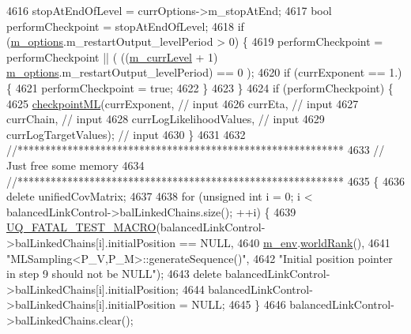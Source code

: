 \begin{DoxyCode}
{{4616     stopAtEndOfLevel = currOptions->m\_stopAtEnd;
4617     \textcolor{keywordtype}{bool} performCheckpoint = stopAtEndOfLevel;
4618     \textcolor{keywordflow}{if} (\hyperlink{class_q_u_e_s_o_1_1_m_l_sampling_af8504cc57ec72b3c52833826b2bfff8e}{m\_options}.m\_restartOutput\_levelPeriod > 0) \{
4619       performCheckpoint = performCheckpoint || ( ((\hyperlink{class_q_u_e_s_o_1_1_m_l_sampling_af9416874c856e50f3b35270e801f17e4}{m\_currLevel} + 1) %
      \hyperlink{class_q_u_e_s_o_1_1_m_l_sampling_af8504cc57ec72b3c52833826b2bfff8e}{m\_options}.m\_restartOutput\_levelPeriod) == 0 );
4620       \textcolor{keywordflow}{if} (currExponent == 1.) \{
4621         performCheckpoint = \textcolor{keyword}{true};
4622       \}
4623     \}
4624     \textcolor{keywordflow}{if} (performCheckpoint) \{
4625       \hyperlink{class_q_u_e_s_o_1_1_m_l_sampling_aa8e7bb1bd54ccafb9b276127a76eba71}{checkpointML}(currExponent,            \textcolor{comment}{// input}
4626                    currEta,                 \textcolor{comment}{// input}
4627                    currChain,               \textcolor{comment}{// input}
4628                    currLogLikelihoodValues, \textcolor{comment}{// input}
4629                    currLogTargetValues);    \textcolor{comment}{// input}
4630     \}
4631 
4632     \textcolor{comment}{//***********************************************************}
4633     \textcolor{comment}{// Just free some memory}
4634     \textcolor{comment}{//***********************************************************}
4635     \{
4636       \textcolor{keyword}{delete} unifiedCovMatrix;
4637 
4638       \textcolor{keywordflow}{for} (\textcolor{keywordtype}{unsigned} \textcolor{keywordtype}{int} i = 0; i < balancedLinkControl->balLinkedChains.size(); ++i) \{
4639         \hyperlink{_defines_8h_a56d63d18d0a6d45757de47fcc06f574d}{UQ\_FATAL\_TEST\_MACRO}(balancedLinkControl->balLinkedChains[i].initialPosition == 
      NULL,
4640                             \hyperlink{class_q_u_e_s_o_1_1_m_l_sampling_a13f1ca4fe9f94822fe572a743eaced1d}{m\_env}.\hyperlink{class_q_u_e_s_o_1_1_base_environment_a78b57112bbd0e6dd0e8afec00b40ffa7}{worldRank}(),
4641                             \textcolor{stringliteral}{"MLSampling<P\_V,P\_M>::generateSequence()"},
4642                             \textcolor{stringliteral}{"Initial position pointer in step 9 should not be NULL"});
4643         \textcolor{keyword}{delete} balancedLinkControl->balLinkedChains[i].initialPosition;
4644         balancedLinkControl->balLinkedChains[i].initialPosition = NULL;
4645       \}
4646       balancedLinkControl->balLinkedChains.clear();
}}
\end{DoxyCode}
